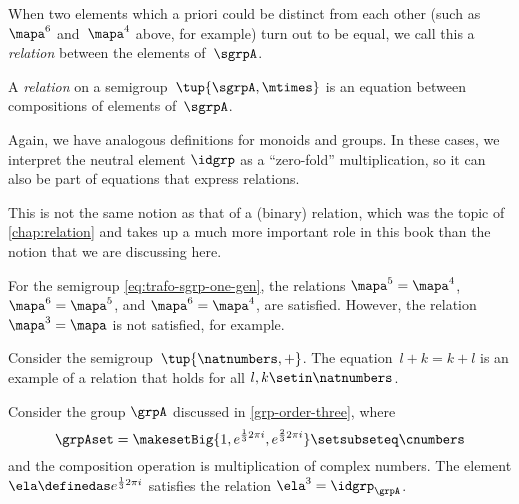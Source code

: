 When two elements which a priori could be distinct from each other (such as~$\mapa^6$ and~$\mapa^4$ above, for example) turn out to be equal, we call this a \emph{relation} between the elements of~$\sgrpA$.

\begin{ctdefinition}\label{def:relation-on-semigroup}
    A \emph{relation} on a semigroup~$\tup{\sgrpA, \mtimes}$ is an equation between compositions of elements of~$\sgrpA$.
\end{ctdefinition}

\begin{remark}
    Again, we have analogous definitions for monoids and groups.
    In these cases, we interpret the neutral element $\idgrp$ as a ``zero-fold'' multiplication, so it can also be part of equations that express relations.
\end{remark}

\begin{remark}
    This is not the same notion as that of a (binary) relation, which was the topic of \cref{chap:relation} and takes up a much more important role in this book than the notion that we are discussing here.
\end{remark}

\begin{example}
    For the semigroup \cref{eq:trafo-sgrp-one-gen}, the relations $\mapa^5 = \mapa^4$, $\mapa^6 = \mapa^5$, and $\mapa^6 = \mapa^4$, \etc are satisfied.
    However, the relation $\mapa^3 = \mapa$ is not satisfied, for example.

\end{example}

\begin{example}
    Consider the semigroup~$\tup{\natnumbers, +}$.
    The equation~$l + k = k + l$ is an example of a relation that holds for all $l, k \setin \natnumbers$.
\end{example}

\begin{example}
    Consider the group $\grpA$ discussed in \cref{grp-order-three}, where
    \begin{equation}
        \grpAset = \makesetBig{ 1, e^{\frac{1}{3}2\pi i}, e^{\frac{2 }{3}2\pi i} } \setsubseteq \cnumbers
    \end{equation}
    and the composition operation is multiplication of complex numbers.
    The element $\ela \definedas e^{\frac{1}{3}2\pi i}$ satisfies the relation $\ela^3 = \idgrp_\grpA$.
\end{example}


